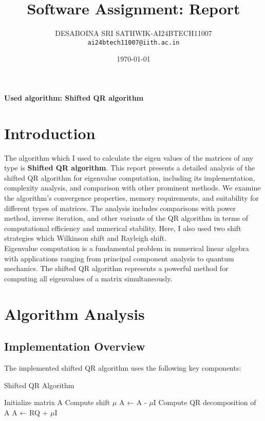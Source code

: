 \documentclass{article}
\title{Software Assignment: Report}
\author{
  DESABOINA SRI SATHWIK-AI24BTECH11007\\%
  \texttt{ai24btech11007@iith.ac.in} \\
}
\date{\today}
\begin{document}
\maketitle

\begin{center}
\textbf{Used algorithm: Shifted QR algorithm}
\end{center}

\section{Introduction}
The algorithm which I used to calculate the eigen values of the matrices of any type is \textbf{Shifted QR algorithm}. This report presents a detailed analysis of the shifted QR algorithm for eigenvalue computation, including its implementation, complexity analysis, and comparison with other prominent methods. We examine the algorithm's convergence properties, memory requirements, and suitability for different types of matrices. The analysis includes comparisons with power method, inverse iteration, and other variants of the QR algorithm in terms of computational efficiency and numerical stability. Here, I also used two shift strategies which Wilkinson shift and Rayleigh shift.\\

Eigenvalue computation is a fundamental problem in numerical linear algebra with applications ranging from principal component analysis to quantum mechanics. The shifted QR algorithm represents a powerful method for computing all eigenvalues of a matrix simultaneously.

\section{Algorithm Analysis}

\subsection{Implementation Overview}
The implemented shifted QR algorithm uses the following key components:

\begin{algorithm}[H]
\caption{Shifted QR Algorithm}
	\begin{algorithmic}[1]
\State Initialize matrix A
    \State Compute shift $\mu$
    \State A ← A - $\mu$I
    \State Compute QR decomposition of A
    \State A ← RQ + $\mu$I
\EndWhile
\end{algorithmic}
\end{algorithm}
\end{document}

